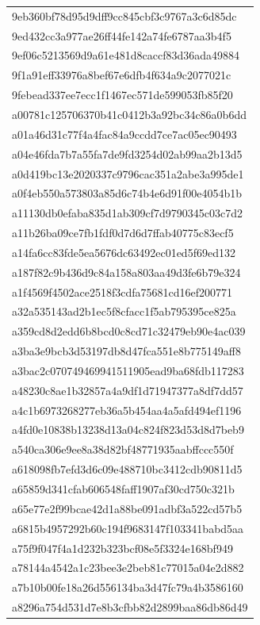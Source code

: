 \begin{tabular}{l}
9eb360bf78d95d9dff9cc845cbf3c9767a3c6d85dc \\
9ed432cc3a977ae26ff44fe142a74fe6787aa3b4f5 \\
9ef06c5213569d9a61e481d8caccf83d36ada49884 \\
9f1a91eff33976a8bef67e6dfb4f634a9c2077021c \\
9febead337ee7ecc1f1467ec571de599053fb85f20 \\
a00781c125706370b41c0412b3a92bc34c86a0b6dd \\
a01a46d31c77f4a4fac84a9ccdd7ce7ac05ec90493 \\
a04e46fda7b7a55fa7de9fd3254d02ab99aa2b13d5 \\
a0d419bc13e2020337c9796cac351a2abe3a995de1 \\
a0f4eb550a573803a85d6c74b4e6d91f00e4054b1b \\
a11130db0efaba835d1ab309cf7d9790345c03c7d2 \\
a11b26ba09ce7fb1fdf0d7d6d7ffab40775c83ecf5 \\
a14fa6cc83fde5ea5676dc63492ec01ed5f69ed132 \\
a187f82c9b436d9c84a158a803aa49d3fe6b79e324 \\
a1f4569f4502ace2518f3cdfa75681cd16ef200771 \\
a32a535143ad2b1ec5f8cfacc1f5ab795395ce825a \\
a359cd8d2edd6b8bcd0c8cd71c32479eb90e4ac039 \\
a3ba3e9bcb3d53197db8d47fca551e8b775149aff8 \\
a3bac2c070749469941511905ead9ba68fdb117283 \\
a48230c8ae1b32857a4a9df1d71947377a8df7dd57 \\
a4c1b6973268277eb36a5b454aa4a5afd494ef1196 \\
a4fd0e10838b13238d13a04c824f823d53d8d7beb9 \\
a540ca306e9ee8a38d82bf48771935aabffccc550f \\
a618098fb7efd3d6c09e488710bc3412cdb90811d5 \\
a65859d341cfab606548faff1907af30cd750c321b \\
a65e77e2f99bcae42d1a88be091adbf3a522cd57b5 \\
a6815b4957292b60c194f9683147f103341babd5aa \\
a75f9f047f4a1d232b323bcf08e5f3324e168bf949 \\
a78144a4542a1c23bee3e2beb81c77015a04e2d882 \\
a7b10b00fe18a26d556134ba3d47fc79a4b3586160 \\
a8296a754d531d7e8b3cfbb82d2899baa86db86d49 \\

\end{tabular}
